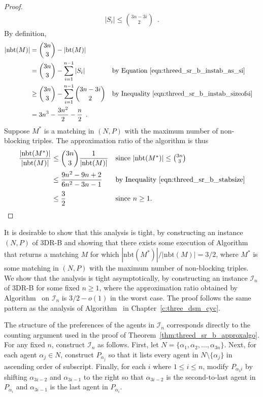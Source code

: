 \begin{proof}
\begin{align}
    |S_i| \leq \binom{3n - 3i}{2}\label{eqn:threed_sr_b_instab_sizeofsi}\enspace.
\end{align}
By definition,
\begingroup
\allowdisplaybreaks
\begin{align}
    |\text{nbt}(M)| &= \binom{3n}{3} - |\text{bt}(M)|\nonumber\\
    &= \binom{3n}{3} - \sum\limits_{i=1}^{n - 1} |S_i|  && \mbox{by Equation~\ref{eqn:threed_sr_b_instab_as_si}} \nonumber\\
    &\geq \binom{3n}{3} - \sum\limits_{i=1}^{n - 1} \binom{3n-3i}{2} && \mbox{by Inequality~\ref{eqn:threed_sr_b_instab_sizeofsi}}\nonumber\\
    &= 3n^3 - \frac{3n^2}{2} - \frac{n}{2}\enspace.\label{eqn:threed_sr_b_stabsize}
\end{align}
\endgroup
Suppose $M^*$ is a matching in $(N, P)$ with the maximum number of non-blocking triples. The approximation ratio of the algorithm is thus
\begin{align*}
    \frac{|\textrm{nbt}(M^*)|}{|\textrm{nbt}(M)|} &\leq 
    \binom{3n}{3} \frac{1}{|\textrm{nbt}(M)|} && \mbox{since $|\textrm{nbt}(M^*)| \leq \binom{3n}{3}$}\\[0.2em]
    &\leq \frac{9n^2 - 9n + 2}{6n^2 - 3n - 1} && \mbox{by Inequality~\ref{eqn:threed_sr_b_stabsize}}\\[0.2em]
    &\leq \frac{3}{2} && \mbox{since $n\geq 1$.}
\end{align*}
\end{proof}

It is desirable to show that this analysis is tight, by constructing an instance $(N, P)$ of 3DR-B and showing that there exists some execution of Algorithm~ that returns a matching $M$ for which $|\textrm{nbt}(M^*)|/|\textrm{nbt}(M)| = 3/2$, where $M^*$ is some matching in $(N, P)$ with the maximum number of non-blocking triples. We show that the analysis is tight asymptotically, by constructing an instance $\mathcal{I}_n$ of 3DR-B for some fixed $n \geq 1$, where the approximation ratio obtained by Algorithm~ on $\mathcal{I}_n$ is $3/2 - o(1)$ in the worst case. The proof follows the same pattern as the analysis of Algorithm~ in Chapter~\ref{c:three_dsm_cyc}.

The structure of the preferences of the agents in $\mathcal{I}_n$ corresponds directly to the counting argument used in the proof of Theorem~\ref{thm:threed_sr_b_approxalgo}. For any fixed $n$, construct $\mathcal{I}_n$ as follows. First, let $N = \{ \alpha_1, \alpha_2, \dots, \alpha_{3n} \}$. Next, for each agent $\alpha_j \in N$, construct $P_{\alpha_j}$ so that it lists every agent in $N \setminus \{ \alpha_j \}$ in ascending order of subscript. Finally, for each $i$ where $1\leq i \leq n$, modify $P_{\alpha_3i}$ by shifting $\alpha_{3i - 2}$ and $\alpha_{3i - 1}$ to the right so that $\alpha_{3i - 2}$ is the second-to-last agent in $P_{\alpha_i}$ and $\alpha_{3i - 1}$ is the last agent in $P_{\alpha_i}$.

